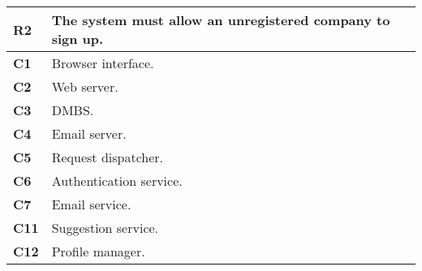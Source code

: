 \begin{table}[H]
    \centering
    \begin{tabular}{|l|m{10cm}|}
        \hline \textbf{R2} & The system must allow an unregistered company to sign up. \\
        \hline \textbf{C1} & Browser interface. \\
        \hline \textbf{C2} & Web server. \\
        \hline \textbf{C3} & DMBS. \\
        \hline \textbf{C4} & Email server. \\
        \hline \textbf{C5} & Request dispatcher. \\
        \hline \textbf{C6} & Authentication service. \\
        \hline \textbf{C7} & Email service. \\
        \hline \textbf{C11} & Suggestion service. \\
        \hline \textbf{C12} & Profile manager.\\
        \hline
    \end{tabular}
\end{table}

